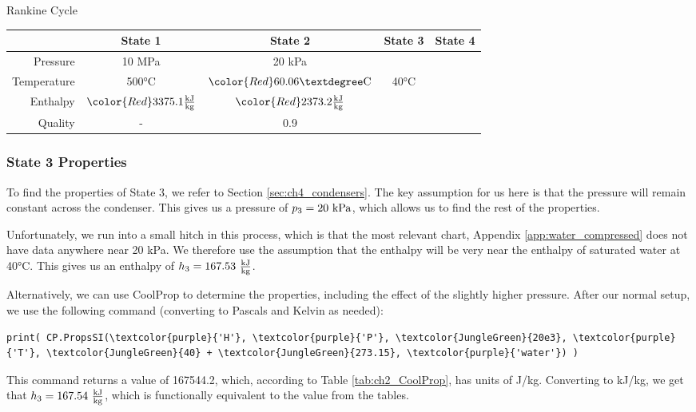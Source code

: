 \begin{example}[label=ex:RankineCycle]{Rankine Cycle}
  \begin{table}[H]
    \centering
    \def\arraystretch{1.5}
    \begin{tabular}{r|cccc}
      & State 1 & State 2 & State 3 & State 4 \\ \hline
      Pressure    & 10 MPa  & 20 kPa  &         &         \\
      Temperature & 500°C   & ${\color{Red} 60.06{\rm °C}}$   &  40°C   &     \\
      Enthalpy    & ${\color{Red} 3375.1 \frac{\rm kJ}{\rm kg}}$        & ${\color{Red} 2373.2 \frac{\rm kJ}{\rm kg}}$       &         &         \\
      Quality     & -       & 0.9     &         & 
    \end{tabular}
    \def\arraystretch{1.0}
  \end{table}
  
\subsubsection*{State 3 Properties}

To find the properties of State 3, we refer to Section \ref{sec:ch4_condensers}.  The key assumption for us here is that the pressure will remain constant across the condenser.  This gives us a pressure of $p_3 = 20\ \rm kPa$, which allows us to find the rest of the properties.

Unfortunately, we run into a small hitch in this process, which is that the most relevant chart, Appendix \ref{app:water_compressed} does not have data anywhere near 20 kPa.  We therefore use the assumption that the enthalpy will be very near the enthalpy of saturated water at 40°C.  This gives us an enthalpy of $h_3 = 167.53\ \frac{\rm kJ}{\rm kg}$.

Alternatively, we can use CoolProp to determine the properties, including the effect of the slightly higher pressure.  After our normal setup, we use the following command (converting to Pascals and Kelvin as needed):
\begin{Verbatim}[commandchars=\\\{\}]
print( CP.PropsSI(\textcolor{purple}{'H'}, \textcolor{purple}{'P'}, \textcolor{JungleGreen}{20e3}, \textcolor{purple}{'T'}, \textcolor{JungleGreen}{40} + \textcolor{JungleGreen}{273.15}, \textcolor{purple}{'water'}) )
\end{Verbatim}
This command returns a value of 167544.2, which, according to Table \ref{tab:ch2_CoolProp}, has units of J/kg.  Converting to kJ/kg, we get that $h_3 = 167.54\ \frac{\rm kJ}{\rm kg}$, which is functionally equivalent to the value from the tables.


\end{example}
